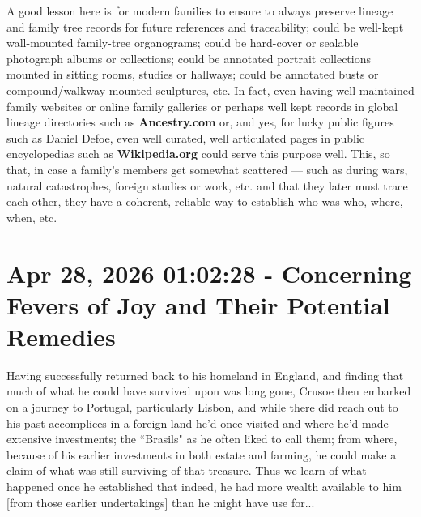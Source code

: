 \documentclass[a4paper]{article}
\begin{document}
A good lesson here is for modern families to ensure to always preserve lineage and family tree records for future references and traceability; could be well-kept wall-mounted family-tree organograms; could be hard-cover or sealable photograph albums or collections; could be annotated portrait collections mounted in sitting rooms, studies or hallways; could be annotated busts or compound/walkway mounted sculptures, etc. In fact, even having well-maintained family websites or online family galleries or perhaps well kept records in global lineage directories such as \textbf{Ancestry.com} or, and yes, for lucky public figures such as Daniel Defoe, even well curated, well articulated pages in public encyclopedias such as \textbf{Wikipedia.org} could serve this purpose well. This, so that, in case a family's members get somewhat scattered --- such as during wars, natural catastrophes, foreign studies or work, etc. and that they later must trace each other, they have a coherent, reliable way to establish who was who, where, when, etc.






\section{Apr 28, 2026 01:02:28 - Concerning Fevers of Joy and Their Potential Remedies}
\label{SEC71}


Having successfully returned back to his homeland in England, and finding that much of what he could have survived upon was long gone, Crusoe then embarked on a journey to Portugal, particularly Lisbon, and while there did reach out to his past accomplices in a foreign land he'd once visited and where he'd made extensive investments; the ``Brasils" as he often liked to call them; from where, because of his earlier investments in both estate and farming, he could make a claim of what was still surviving of that treasure. Thus we learn of what happened once he established that indeed, he had more wealth available to him [from those earlier undertakings] than he might have use for...
\end{document}
